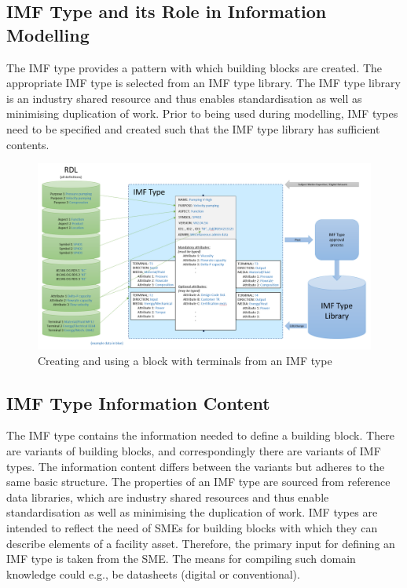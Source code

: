 \documentclass[../main.tex]{subfiles}
\begin{document}
\subsection{IMF Type and its Role in Information Modelling}
The IMF type provides a pattern with which building blocks are created. The appropriate
IMF type is selected from an IMF type library. The IMF type library is an industry shared resource and thus enables standardisation as well as minimising duplication of work. Prior to being used during modelling, IMF types need to be specified and created such that the IMF type library has sufficient contents.

\begin{figure}[htb]
  \centering
  \includegraphics[width=1\textwidth]{img/IMFmanual-img057.png}
  \caption{Creating and using a block with terminals from an IMF type}
  \label{fig:Figure 48}
\end{figure}

\subsection{IMF Type Information Content}
The IMF type contains the information needed to define a building block. There are variants of building blocks, and correspondingly there are variants of IMF types. The information content differs between the variants but adheres to the same basic structure. The properties of an IMF type are sourced from reference data libraries, which are industry shared resources and thus enable standardisation as well as minimising the duplication of work. IMF types are intended to reflect the need of SMEs for building blocks with which they can describe elements of a facility asset. Therefore, the primary input for defining an IMF type is taken from the SME. The means for compiling such domain knowledge could e.g., be datasheets (digital or conventional).
\end{document}
